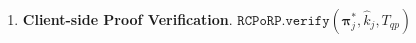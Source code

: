 \begin{enumerate}

%
%



\


\item \textbf{Client-side Proof Verification}.\label{Client-sideProofVerification} $\mathtt{RCPoRP}.\mathtt{verify}(\bm{\pi}^{\scriptscriptstyle *}_{\scriptscriptstyle j}, \hat{k}_{\scriptscriptstyle j},T_{\scriptscriptstyle qp})$
\begin{enumerate}



\end{enumerate}
\end{enumerate}
